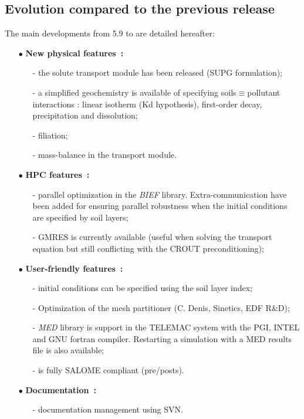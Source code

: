 \subsection{Evolution compared to the previous release}
The main developments from 5.9 to \rel are detailed hereafter:
\begin{itemize}
  \item [$\bullet$] {\bf New physical features~:} 
    \begin{itemize}
      \item [-] the solute transport module has been released (SUPG formulation);
      \item [-] a simplified geochemistry is available of specifying {soils$\equiv$pollutant} interactions : linear isotherm (Kd hypothesis), first-order decay, precipitation and dissolution;
      \item [-] filiation;
      \item [-] mass-balance in the transport module.
    \end{itemize}
  \item [$\bullet$] {\bf HPC features~:} 
    \begin{itemize}
      \item [-] parallel optimization in the \textit{BIEF} library. Extra-communication have been added for ensuring parallel robustness when the initial conditions are specified by soil layers;
      \item [-] GMRES is currently available (useful when solving the transport equation but still conflicting with the CROUT preconditioning);
    \end{itemize}
  \item [$\bullet$] {\bf User-friendly features~:} 
    \begin{itemize}
      \item [-] initial conditions can be specified using the soil layer index;
      \item [-] Optimization of the mesh partitioner (C. Denis, Sinetics, EDF R\&D);
      \item [-] \textit{MED} library is support in the TELEMAC system with the PGI, INTEL and GNU fortran compiler. Restarting a simulation with a MED results file is also available;
      \item [-] \estel \rel is fully SALOME compliant (pre/posts).
    \end{itemize}
  \item [$\bullet$] {\bf Documentation~:} 
    \begin{itemize}
      \item [-] documentation management using SVN.
    \end{itemize}
\end{itemize}

